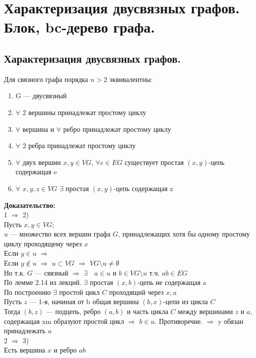 \documentclass[12pt]{article}
\begin{document}
\section{Характеризация двусвязных графов. Блок, bc-дерево графа.}
\subsection{Характеризация двусвязных графов.}
	Для связного графа порядка $n > 2$ эквивалентны:
	\begin{enumerate}
		\item G — двусвязный
		\item $\forall$ 2 вершины принадлежат простому циклу
		\item $\forall$ вершина и $\forall$ ребро принадлежат простому циклу
		\item $\forall$ 2 ребра принадлежат простому циклу
		\item $\forall$ двух вершин $x,y \in VG$, $\forall e \in EG$ существует простая $(x,y)$-цепь содержащая e
		\item $\forall$ $x,y,z \in VG$ $\exists$ простая $(x,y)$-цепь содержащая z
	\end{enumerate}
	\textbf{Доказательство:}\\
		1 $\Rightarrow$ 2)\\
		Пусть $x,y \in VG$;\\
		$u$ — множество всех вершин графа $G$, принадлежащих хотя бы одному простому циклу проходящему через $x$\\
		Если $y \in u$ $\Rightarrow$ \qedsymbol\\
		Если $y \notin u$ $\Rightarrow$ $u \subset VG$ $\Rightarrow$ $VG \setminus u \neq \emptyset$\\
		Но т.к. $G$ — связный $\Rightarrow$ $\exists \quad a \in u$ и $b \in VG \setminus u$ т.ч. $ab \in EG$\\
		По лемме 2.14 из лекций. $\exists$ простая $(x,b)$-цепь не содержащая a\\
		По построению $\exists$ простой цикл $C$ проходящий через $x,a$\\
		Пусть $z$ — 1-я, начиная от b общая вершина $(b,x)$-цепи из цикла $C$\\
		Тогда $(b,z)$ — подцепь, ребро $(a,b)$ и часть цикла $C$ между вершинами $z$ и $a$, содержащая xm образуют простой цикл $\Rightarrow$ $b \in u$. Противоречие. $\Rightarrow$ y обязан принадлежать $u$\\
		2 $\Rightarrow$ 3)\\
			Есть вершина $x$ и ребро $ab$\\
\end{document}
